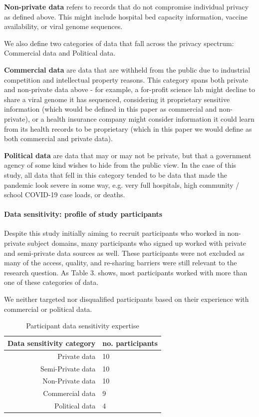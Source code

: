 \documentclass{CUP-JNL-DAP}%
\begin{document}
\textbf{Non-private data} refers to records that do not compromise individual privacy as defined above. This might include hospital bed capacity information, vaccine availability, or viral genome sequences.

We also define two categories of data that fall across the privacy spectrum: Commercial data and Political data.

\textbf{Commercial data} are data that are withheld from the public due to industrial competition and intellectual property reasons. This category spans both private and non-private data above - for example, a for-profit science lab might decline to share a viral genome it has sequenced, considering it proprietary sensitive information (which would be defined in this paper as commercial and non-private), or a health insurance company might consider information it could learn from its health records to be proprietary (which in this paper we would define as both commercial and private data).

\textbf{Political data} are data that may or may not be private, but that a government agency of some kind wishes to hide from the public view. In the case of this study, all data that fell in this category tended to be data that made the pandemic look severe in some way, e.g. very full hospitals, high community / school COVID-19 case loads, or deaths. 

\paragraph{Data sensitivity: profile of study participants}

Despite this study initially aiming to recruit participants who worked in non-private subject domains, many participants who signed up worked with private and semi-private data sources as well. These participants were not excluded as many of the access, quality, and re-sharing barriers were still relevant to the research question. As Table 3. shows, most participants worked with more than one of these categories of data. 

We neither targeted nor disqualified participants based on their experience with commercial or political data. 

\begin{table}[h!]
  \begin{center}
    \caption{Participant data sensitivity expertise}
    \label{tab:data_sensitivity}
    \begin{tabular}{r|l}  %
      \textbf{Data sensitivity category} & \textbf{no. participants} \\
      \hline
      Private data & 10\\
      Semi-Private data & 10\\
      Non-Private data & 10 \\
      Commercial data & 9\\ 
      Political data & 4\\ 
    \end{tabular}
  \end{center}
\end{table}
\end{document}
